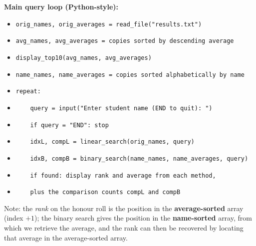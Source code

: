 \documentclass[11pt]{article}
\begin{document}
\begin{exemplebox}
\textbf{Main query loop (Python-style):}
\begin{itemize}
    \item \texttt{orig\_names, orig\_averages = read\_file("results.txt")}
    \item \texttt{avg\_names, avg\_averages = copies sorted by descending average}
    \item \texttt{display\_top10(avg\_names, avg\_averages)}
    \item \texttt{name\_names, name\_averages = copies sorted alphabetically by name}
    \item \texttt{repeat:}
    \item \texttt{~~~~query = input("Enter student name (END to quit): ")}
    \item \texttt{~~~~if query = "END": stop}
    \item \texttt{~~~~idxL, compL = linear\_search(orig\_names, query)}
    \item \texttt{~~~~idxB, compB = binary\_search(name\_names, name\_averages, query)}
    \item \texttt{~~~~if found: display rank and average from each method,}
    \item \texttt{~~~~plus the comparison counts compL and compB}
\end{itemize}
Note: the \emph{rank} on the honour roll is the position in the \textbf{average-sorted} array (index $+1$); the binary search gives the position in the \textbf{name-sorted} array, from which we retrieve the average, and the rank can then be recovered by locating that average in the average-sorted array.
\end{exemplebox}
\end{document}
